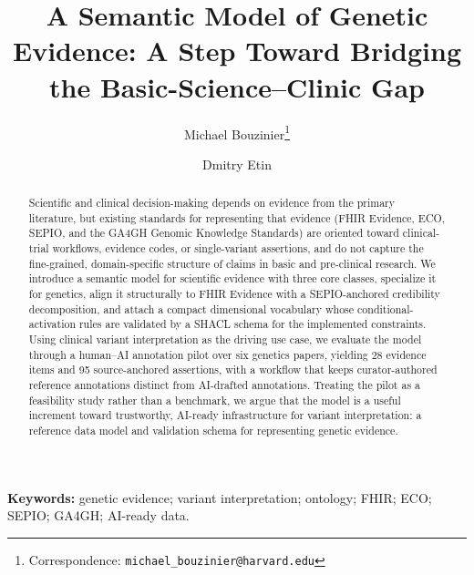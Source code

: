\documentclass[11pt]{article}
\begin{document}
    \title{A Semantic Model of Genetic Evidence: A Step Toward Bridging the Basic-Science--Clinic Gap}

    \author[1,2,3]{Michael Bouzinier\thanks{Correspondence: \texttt{michael\_bouzinier@harvard.edu}}}
    \author[3,4]{Dmitry Etin}
    \date{}

    \maketitle

    \begin{abstract}
        Scientific and clinical decision-making depends on evidence from
        the primary literature, but existing standards for representing
        that evidence (FHIR Evidence, ECO, SEPIO, and the GA4GH Genomic
        Knowledge Standards) are oriented toward clinical-trial workflows,
        evidence codes, or single-variant assertions, and do not capture
        the fine-grained, domain-specific structure of claims in basic and
        pre-clinical research. We introduce a semantic model for scientific
        evidence with three core classes, specialize it for genetics, align it structurally to FHIR Evidence with a
        SEPIO-anchored credibility decomposition, and attach a compact
        dimensional vocabulary whose conditional-activation rules are
        validated by a SHACL schema for the implemented constraints. Using clinical variant
        interpretation as the driving use case, we evaluate the model
        through a human--AI annotation pilot over six genetics papers,
        yielding 28 evidence items and 95 source-anchored assertions, with
        a workflow that keeps curator-authored reference annotations distinct from
        AI-drafted annotations. Treating the pilot as a feasibility study
        rather than a benchmark, we argue that the model is a useful
        increment toward trustworthy, AI-ready infrastructure for variant
        interpretation: a reference data model and validation schema for
        representing genetic evidence.
    \end{abstract}

    \medskip
    \noindent\textbf{Keywords:} genetic evidence; variant interpretation;
    ontology; FHIR; ECO; SEPIO; GA4GH; AI-ready data.
\end{document}
